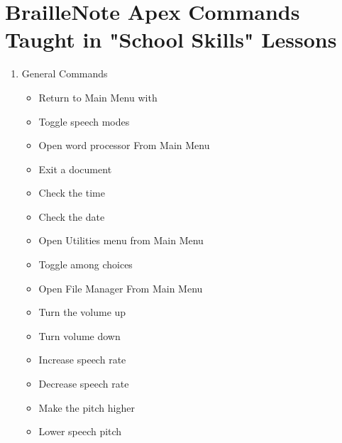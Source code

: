 \documentclass[10pt,letterpaper,twoside]{report}
\begin{document}
{\clearpage
\section{BrailleNote Apex Commands Taught in "School Skills" Lessons}
\begin{enumerate}
	\item General Commands
	      \begin{itemize}
		      \item Return to Main Menu with 
		      \item Toggle speech modes 
		      \item Open word processor From Main Menu 
		      \item Exit a document 
		      \item Check the time 
		      \item Check the date 
		      \item Open Utilities menu from Main Menu 
		      \item Toggle among choices 
		      \item Open File Manager From Main Menu 
		      \item Turn the volume up 
		      \item Turn volume down 
		      \item Increase speech rate 
		      \item Decrease speech rate 
		      \item Make the pitch higher 
		      \item Lower speech pitch 

\end{itemize}
\end{enumerate}}
\end{document}
